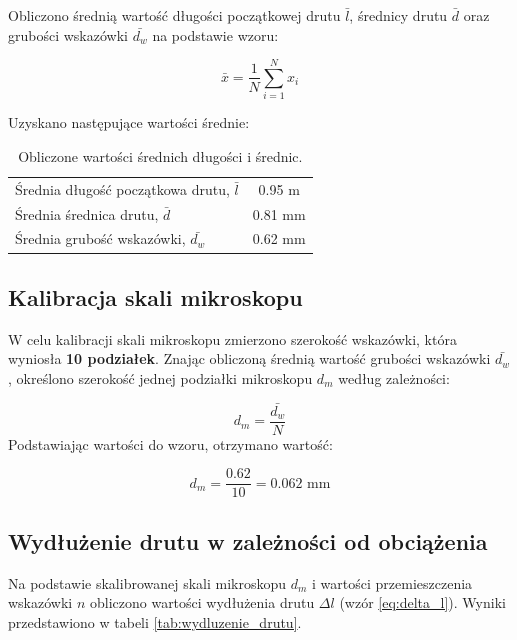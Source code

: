 \documentclass[a4paper,12pt]{article}
\begin{document}
Obliczono średnią wartość długości początkowej drutu $\bar{l}$, średnicy drutu $\bar{d}$ oraz grubości wskazówki $\bar{d_w}$ na podstawie wzoru:

\begin{equation}
    \bar{x} = \frac{1}{N} \sum_{i=1}^{N} x_i
\end{equation}

Uzyskano następujące wartości średnie:

\begin{table}[h]
    \centering
    \begin{tabular}{l c}
        \toprule
        Średnia długość początkowa drutu, $\bar{l}$ & 0.95 m \\
        Średnia średnica drutu, $\bar{d}$ & 0.81 mm \\
        Średnia grubość wskazówki, $\bar{d_w}$ & 0.62 mm \\
        \bottomrule
    \end{tabular}
    \caption{Obliczone wartości średnich długości i średnic.}
    \label{tab:srednie_wartosci}
\end{table}

\subsection{Kalibracja skali mikroskopu}

W celu kalibracji skali mikroskopu zmierzono szerokość wskazówki, która wyniosła \textbf{10 podziałek}. Znając obliczoną średnią wartość grubości wskazówki $\bar{d_w}$, określono szerokość jednej podziałki mikroskopu $d_m$ według zależności:

\begin{equation*}
    d_m = \frac{\bar{d_w}}{N}
\end{equation*}
Podstawiając wartości do wzoru, otrzymano wartość:

\begin{equation*}
    d_m = \frac{0.62}{10} = 0.062 \text{ mm}
\end{equation*}

\subsection{Wydłużenie drutu w zależności od obciążenia}

Na podstawie skalibrowanej skali mikroskopu $d_m$ i wartości przemieszczenia wskazówki $n$ obliczono wartości wydłużenia drutu $\Delta l$ (wzór \ref{eq:delta_l}). Wyniki przedstawiono w tabeli \ref{tab:wydluzenie_drutu}.
\end{document}
